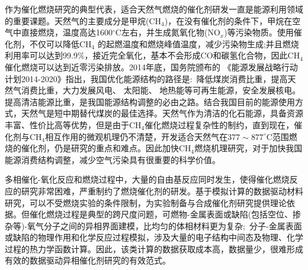 作为催化燃烧研究的典型代表，适合天然气燃烧的催化剂研发一直是能源利用领域的重要课题。天然气的主要成分是甲烷($\mathrm{CH}_4$)，在没有催化剂的条件下，甲烷在空气中直接燃烧，温度高达1600$^{\circ}\mathrm{C}$左右，并生成氮氧化物($\mathrm{NO}_x$)等污染物质。使用催化剂，不仅可以降低$\mathrm{CH}_4$ 的起燃温度和燃烧峰值温度，减少污染物生成;并且燃烧利用率可以达到99.9\%，接近完全氧化，基本不会形成\textrm{CO}和碳氢化合物，因此$\mathrm{CH}_4$ 催化燃烧可以达到近零污染排放。2014年底，国务院颁布的 《能源发展战略行动计划2014-2020》指出，我国优化能源结构的路径是:~降低煤炭消费比重，提高天然气消费比重，大力发展风电、 太阳能、 地热能等可再生能源，安全发展核电。提高清洁能源比重，是我国能源结构调整的必由之路。结合我国目前的能源使用方式，天然气是短中期替代煤炭的最佳选择。天然气作为清洁的化石能源，具备资源丰富、性价比高等优势，但是由于$\mathrm{CH}_4$催化燃烧过程复杂性的制约，直到现在，催化剂与$\mathrm{CH}_4$相互作用的微观机理仍不清楚，开发适合天然气在$377\sim877^{\circ}\mathrm{C}$范围燃烧的催化剂，仍是研究的重点和难点。因此加快$\mathrm{CH}_4$燃烧机理研究，对于加快我国能源消费结构调整，减少空气污染具有很重要的科学价值。

多相催化-氧化反应和燃烧过程中，大量的自由基反应同时发生，使得催化燃烧反应的研究非常困难，严重制约了燃烧催化剂的研发。基于模拟计算的数据驱动材料研究，可以不受燃烧实验的条件限制，为实验制备与合成催化剂研究提供理论依据。但催化燃烧过程是典型的跨尺度问题，可燃物-金属表面或缺陷(包括空位、掺杂等)-氧气分子之间的异相界面建模，比均匀的体相材料更为复杂;~分子-金属表面或缺陷的物理作用和化学反应过程模拟，涉及大量的电子结构中间态及物理、化学过程的热力学函数计算。因此，该类计算的数据获取成本高，数据量少，很难形成有效的数据驱动异相催化剂研究的有效范式。


